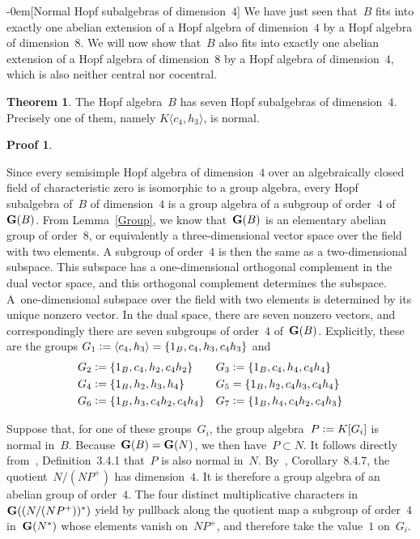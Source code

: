 \documentclass{article}
\makeatletter
\renewcommand{\subsection}{\@startsection{subsection}{2}{0em}%
{\baselineskip}{-0em}{\bfseries\normalsize}}
\newcounter{num}
\newenvironment{pflist}{\begin{list}{(\arabic{num})}{\usecounter{num} \leftmargin0cm \itemindent5pt}}{\end{list}}
\newcounter{num1}
\numberwithin{equation}{section}
\theoremstyle{definition}
\newtheorem*{pf}{Proof}
\newtheorem*{thm}{Theorem}
\theoremstyle{break}
\newcommand{\deq}{\vcentcolon =}
\newcommand{\K}{1}
\newcommand{\1}{{(1)}}
\newcommand{\2}{{(2)}}
\newcommand{\3}{{(3)}}
\newcommand{\B}{1_B}
\makeatother
\begin{document}
\subsection[Normal Hopf subalgebras of dimension~$4$]{} \label{normal4}
We have just seen that~$B$ fits into exactly one abelian extension of a Hopf algebra of dimension~$4$ by a Hopf algebra of dimension~$8$. We will now show that~$B$ also fits into exactly one abelian extension of a Hopf algebra of dimension~$8$ by a Hopf algebra of dimension~$4$, which is also neither central nor cocentral.
\begin{thm} \label{all4}
The Hopf algebra~$B$ has seven Hopf subalgebras of dimension~$4$. Precisely one of them, namely $K\langle c_4, h_3 \rangle$, is normal.
\end{thm}
\begin{pf}
\begin{pflist}
\item Since every semisimple Hopf algebra of dimension~$4$ over an algebraically closed field of characteristic zero is isomorphic to a group algebra, every Hopf subalgebra of~$B$ of dimension~$4$ is a group algebra of a subgroup of order~$4$ of~${\bf G}(B)$. From Lemma~\ref{Group}, we know that~${\bf G}(B)$ is an elementary abelian group of order~$8$, or equivalently a three-dimensional vector space over the field with two elements. A subgroup of order~$4$ is then the same as a two-dimensional subspace. This subspace has a one-dimensional orthogonal complement in the dual vector space, and this orthogonal complement determines the subspace. A~one-dimensional subspace over the field with two elements is determined by its unique nonzero vector. In the dual space, there are seven nonzero vectors, and correspondingly there are seven subgroups of order~$4$ of~${\bf G}(B)$. Explicitly, these are the groups $G_1 \deq \langle c_4, h_3 \rangle = \{\B, c_4, h_3, c_4 h_3\}$ and
\begin{align*}
G_2 &\deq \{\B, c_4, h_2, c_4 h_2\} & 
G_3 &\deq \{\B, c_4, h_4, c_4 h_4\} \\
G_4 &\deq \{\B, h_2, h_3, h_4\} & G_5 &= \{\B, h_2, c_4 h_3, c_4 h_4\} \\
G_6 &\deq \{\B, h_3, c_4 h_2, c_4 h_4\} &
G_7 &\deq \{\B, h_4, c_4 h_2, c_4 h_3\}
\end{align*}

\item
Suppose that, for one of these groups~$G_i$, the group algebra~$P \deq K[G_i]$ is normal in~$B$. Because~${\bf G}(B) = {\bf G}(N)$, we then have~$P \subset N$. It follows directly from~\cite{M}, Definition~3.4.1 that~$P$ is also normal in~$N$. By~\cite{M}, Corollary~8.4.7, the quotient~$N/(NP^+)$ has dimension~$4$. It is therefore a group algebra of an abelian group of order~$4$. The four distinct multiplicative characters
in~${\bf G}((N/(NP^+))^*)$ yield by pullback along the quotient map a subgroup of order~$4$ in~${\bf G}(N^*)$ whose elements vanish on~$NP^+$, and therefore take the value~$\K$ on~$G_i$.


\end{pflist}
\end{pf}
\end{document}
